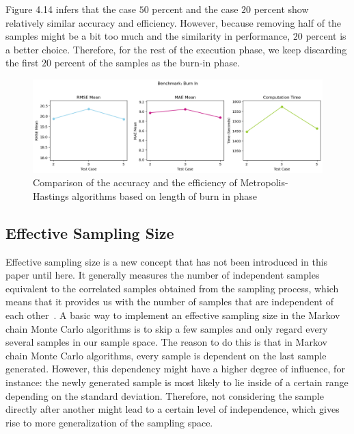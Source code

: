 Figure 4.14 infers that the case $50$ percent and the case $20$ percent show relatively similar accuracy and efficiency. However, because removing half of the samples might be a bit too much and the similarity in performance, $20$ percent is a better choice. Therefore, for the rest of the execution phase, we keep discarding the first $20$ percent of the samples as the burn-in phase.

\begin{figure}[H]
    \centering
    \includegraphics[width=1\textwidth]{figures/basic_mh/benchmark/burnin_factor.png}
    \captionsetup{width=.8\textwidth}
    \caption{Comparison of the accuracy and the efficiency of Metropolis-Hastings algorithms based on length of burn in phase}
    \label{fig:enter-label}
\end{figure}

\subsection{Effective Sampling Size}
Effective sampling size is a new concept that has not been introduced in this paper until here. It generally measures the number of independent samples equivalent to the correlated samples obtained from the sampling process, which means that it provides us with the number of samples that are independent of each other~\cite{effective_samples_size}. A basic way to implement an effective sampling size in the Markov chain Monte Carlo algorithms is to skip a few samples and only regard every several samples in our sample space. The reason to do this is that in Markov chain Monte Carlo algorithms, every sample is dependent on the last sample generated. However, this dependency might have a higher degree of influence, for instance: the newly generated sample is most likely to lie inside of a certain range depending on the standard deviation. Therefore, not considering the sample directly after another might lead to a certain level of independence, which gives rise to more generalization of the sampling space. 

